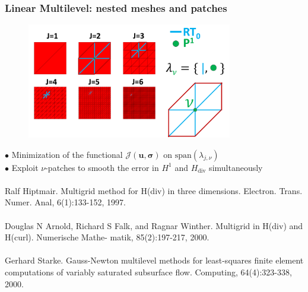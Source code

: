 \documentclass[8pt, oneside]{beamer}   	%
\newcommand{\bu}{\textbf{u}}
\newcommand{\bsigma}{\boldsymbol{\sigma}}
\newcommand{\titlecolor}[1]{\frametitle{\textcolor{dkgrey}{ \textbf{#1}}}}
\begin{document}
\begin{frame}
\titlecolor{Linear Multilevel: nested meshes and patches}
\footnotesize

\begin{figure}[htbp!]
	\includegraphics[width=0.8\textwidth]{img/refinementpatch.pdf}
		\label{abb_arc}
\end{figure}
$\bullet$ Minimization of the functional $\mathcal{J}(\bu,\bsigma)$ on $\text{span}(\lambda_{j,\nu})$\\
$\bullet$ Exploit $\nu$-patches to smooth the error in $H^1$ and $H_{\text{div}}$ simultaneously\\
${}$\\
\tiny{Ralf Hiptmair. Multigrid method for H(div) in three dimensions. Electron. Trans. Numer. Anal, 6(1):133-152, 1997.}${}$\\
${}$\\
\tiny{Douglas N Arnold, Richard S Falk, and Ragnar Winther. Multigrid in H(div) and H(curl). Numerische Mathe-
matik, 85(2):197-217, 2000.}
${}$\\
${}$\\
\tiny{
Gerhard Starke. Gauss-Newton multilevel methods for least-squares finite element computations of variably saturated subsurface flow. Computing, 64(4):323-338, 2000.}

\end{frame}












\end{document}
